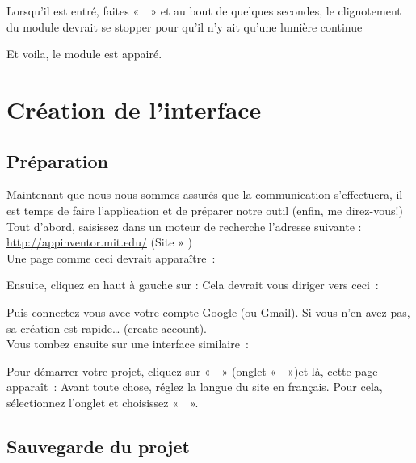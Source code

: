 Lorsqu'il est entré, faites «  » et au bout de quelques secondes, le clignotement du module devrait se stopper pour qu'il n'y ait qu'une lumière continue 



Et voila, le module est appairé.\chapter{Création de l'interface}
\section{Préparation}
Maintenant que nous nous sommes assurés que la communication s'effectuera, il est temps de faire l'application et de préparer notre outil (enfin, me direz-vous!) \\

\noindent
Tout d'abord, saisissez dans un moteur de recherche l'adresse suivante : 
\url{http://appinventor.mit.edu/} (Site » ) \\

Une page comme ceci devrait apparaître :


Ensuite, cliquez en haut à gauche sur :  
Cela devrait vous diriger vers ceci : \\


Puis connectez vous avec votre compte Google (ou Gmail). Si vous n'en avez pas, sa création est rapide… (create account). \\
Vous tombez ensuite sur une interface similaire : 


\noindent
Pour démarrer votre projet, cliquez sur «  » (onglet «  »)et là, cette page apparaît : 
\noindent 
Avant toute chose, réglez la langue du site en français. Pour cela, sélectionnez l'onglet  et choisissez «  ».\\


\section{Sauvegarde du projet}

